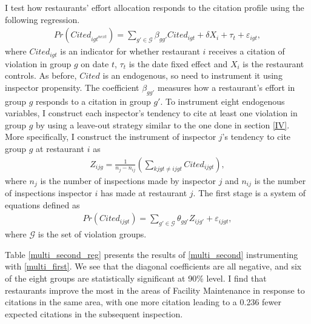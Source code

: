 \documentclass[10pt]{article} %
\begin{document}
I test how restaurants' effort allocation responds to the citation profile using the following regression. 
\begin{align}
\label{multi_second}
    Pr(Cited_{igt^{next}}) = \sum_{g' \in \mathcal{G}} \beta_{gg'} Cited_{igt} + \delta X_i + \tau_t + \varepsilon_{igt},
\end{align}
where $Cited_{igt}$ is an indicator for whether restaurant $i$ receives a citation of violation in group $g$ on date $t$, $\tau_t$ is the date fixed effect and $X_i$ is the restaurant controls. As before, $Cited$ is an endogenous, so need to instrument it using inspector propensity. The coefficient $\beta_{gg'}$ measures how a restaurant's effort in group $g$ responds to a citation in group $g'$. To instrument eight endogenous variables, I construct each inspector's tendency to cite at least one violation in group $g$ by using a leave-out strategy similar to the one done in section \ref{IV}. More specifically, I construct the instrument of inspector $j$'s tendency to cite group $g$ at restaurant $i$ as
\begin{align*}
  Z_{ijg} = \frac{1}{n_j - n_{ij}} \left(\sum_{kjgt \neq ijgt} Cited_{ijgt}\right),
\end{align*}
where $n_j$ is the number of inspections made by inspector $j$ and $n_{ij}$ is the number of inspections inspector $i$ has made at restaurant $j$. The first stage is a system of equations defined as
\begin{align}
\label{multi_first}
    Pr(Cited_{ijgt}) = \sum_{g'\in \mathcal{G}} \theta_{gg'}Z_{ijg'} + \varepsilon_{ijgt}, 
\end{align}
where $\mathcal{G}$ is the set of violation groups. 

Table \ref{multi_second_reg} presents the results of \eqref{multi_second} instrumenting with \eqref{multi_first}. We see that the diagonal coefficients are all negative, and six of the eight groups are statistically significant at 90\% level. I find that restaurants improve the most in the areas of Facility Maintenance in response to citations in the same area, with one more citation leading to a 0.236 fewer expected citations in the subsequent inspection. 

\begin{table}[htbp]
\centering
\scalebox{0.54}{}
\caption{}
\label{multi_second_reg}
\end{table}
\end{document}
